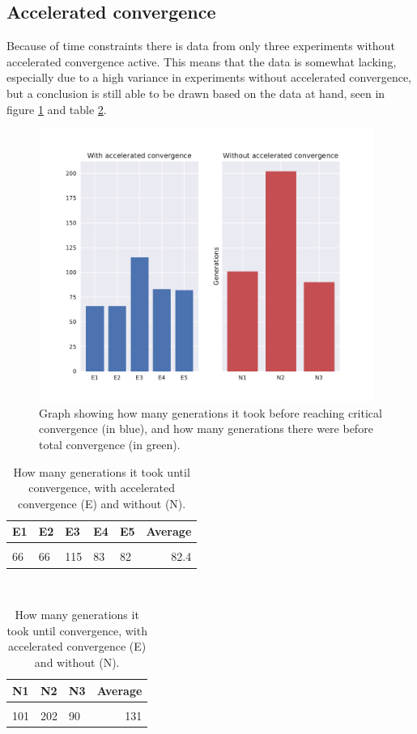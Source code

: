 \documentclass[a4paper,english]{report}
\begin{document}
	\subsection{Accelerated convergence}
	Because of time constraints there is data from only three experiments without accelerated convergence active. This means that the data is somewhat lacking, especially due to a high variance in experiments without accelerated convergence, but a conclusion is still able to be drawn based on the data at hand, seen in figure \ref{fig:accon} and table \ref{table:accon}.
	\begin{figure}[H]
		\centering
		\includegraphics[width=310pt]{accon}
		\caption{Graph showing how many generations it took before reaching critical convergence (in blue), and how many generations there were before total convergence (in green).}
		\label{fig:accon}
	\end{figure}
	\begin{table}[H]
		\centering
		\caption{How many generations it took until convergence, with accelerated convergence (E) and without (N).}
		\label{table:accon}
		\begin{tabular}{lllll|r}
			\\
			\textbf{E1} & \textbf{E2} & \textbf{E3} & \textbf{E4} & \textbf{E5} & \textbf{Average} \\ \hline \\
			66 & 66 & 115 & 83 & 82 & 82.4 \\
		\end{tabular}
	\\[0.5\in]
	
		\begin{tabular}{lll|r}
		\\
		 \textbf{N1} & \textbf{N2} & \textbf{N3} & \textbf{Average} \\ \hline \\
		101 & 202 & 90 & 131 \\
		\end{tabular}
	\end{table}
\end{document}
